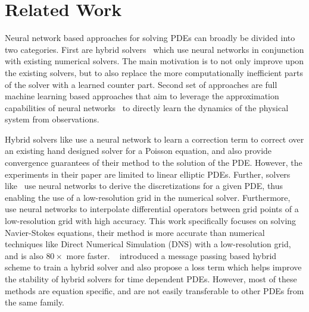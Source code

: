 \section{Related Work}
\label{sec:related_work}

Neural network based approaches for solving PDEs 
can broadly be divided into two categories. 
First are hybrid solvers~\citep{bar2019learning, kochkov2021machine, hsieh2019learning}
which use neural networks in conjunction with existing numerical solvers. The main motivation is to 
not only improve upon the existing solvers, but to 
also replace the more computationally inefficient parts of the solver
with a learned counter part.
Second set of approaches are 
full machine learning based approaches
that aim 
to leverage the 
approximation capabilities of neural networks~\citep{hornik1989multilayer}
to directly learn the dynamics of the physical system from observations.

Hybrid solvers like \citet{hsieh2019learning} use a neural network to learn a correction term 
to correct over an existing hand designed solver for a Poisson equation, and
also provide convergence guarantees of their method to the solution of the PDE.  
However, the experiments in their paper are limited to linear elliptic PDEs.
Further, solvers like~\citet{bar2019learning} use neural networks to derive the discretizations for a given PDE, thus enabling 
the use of a low-resolution grid in the numerical solver. 
Furthermore,~\citet{kochkov2021machine} use neural networks to interpolate differential operators between grid points
of a low-resolution grid with high accuracy. 
This work specifically focuses on solving Navier-Stokes equations, 
their method is more accurate than numerical techniques like Direct Numerical Simulation (DNS) 
with a low-resolution grid, and is also $80\times$ more faster.
~\citet{brandstetter2022message} introduced a message passing based hybrid scheme 
to train a hybrid solver and also propose a loss term which helps improve the stability of hybrid solvers for time dependent PDEs.
However, most of these methods are equation specific, and are not easily
transferable to other PDEs 
from the same family.




